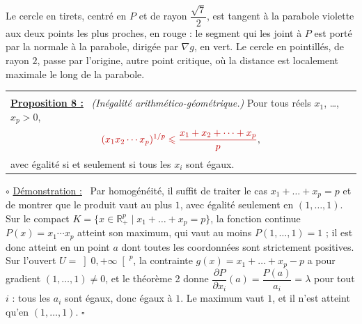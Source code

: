\documentclass[a4paper,twoside]{report}
\makeatletter
\newcommand{\rmath}[1]{\textcolor{rougecours}{#1}}
\newenvironment{cadre}%
 {\par\vspace{2mm}\noindent\begin{tabular}{|@{\hspace{4mm}}p{0.93\textwidth}@{\hspace{4mm}}|}
  \hline \\[-2mm]}%
 {\\[2mm] \hline \end{tabular}\par\vspace{3mm}}
\newcommand{\propo}[1]{\textbf{\underline{Proposition #1 :}}~}
\newenvironment{demo}%
 {\par\needspace{4\baselineskip}\vspace{1mm}\noindent$\circ$ \underline{Démonstration :}~\setlength{\parskip}{3pt plus 1pt}}%
 {\hfill$\square$\par\vspace{2mm}}
\newcommand{\R}{\mathbb{R}}
\newcommand{\dpd}[2]{\dfrac{\partial #1}{\partial #2}}  %
\newcommand{\grad}{\nabla}                        %
\makeatother
\begin{document}
\begin{center}
\end{center}

\noindent Le cercle en tirets, centré en $P$ et de rayon $\dfrac{\sqrt{7}}{2}$, est tangent à la parabole violette aux deux points les plus proches, en rouge : le segment qui les joint à $P$ est porté par la normale à la parabole, dirigée par $\grad g$, en vert. Le cercle en pointillés, de rayon $2$, passe par l'origine, autre point critique, où la distance est localement maximale le long de la parabole.

\begin{cadre}
\propo{8} \emph{(Inégalité arithmético-géométrique.)} Pour tous réels $x_{1}$, \dots, $x_{p} > 0$,
\[ \rmath{(x_{1}x_{2}\cdots x_{p})^{1/p} \leqslant \frac{x_{1} + x_{2} + \dots + x_{p}}{p}}, \]
avec égalité si et seulement si tous les $x_{i}$ sont égaux.
\end{cadre}

\begin{demo}
Par homogénéité, il suffit de traiter le cas $x_{1} + \dots + x_{p} = p$ et de montrer que le produit vaut au plus $1$, avec égalité seulement en $(1, \dots, 1)$. Sur le compact $K = \{x \in \R_{+}^{p} \mid x_{1} + \dots + x_{p} = p\}$, la fonction continue $P(x) = x_{1}\cdots x_{p}$ atteint son maximum, qui vaut au moins $P(1, \dots, 1) = 1$ ; il est donc atteint en un point $a$ dont toutes les coordonnées sont strictement positives. Sur l'ouvert $U = \left]0, +\infty\right[^{p}$, la contrainte $g(x) = x_{1} + \dots + x_{p} - p$ a pour gradient $(1, \dots, 1) \neq 0$, et le théorème 2 donne $\dpd{P}{x_{i}}(a) = \dfrac{P(a)}{a_{i}} = \lambda$ pour tout $i$ : tous les $a_{i}$ sont égaux, donc égaux à $1$. Le maximum vaut $1$, et il n'est atteint qu'en $(1, \dots, 1)$.
\end{demo}
\end{document}
